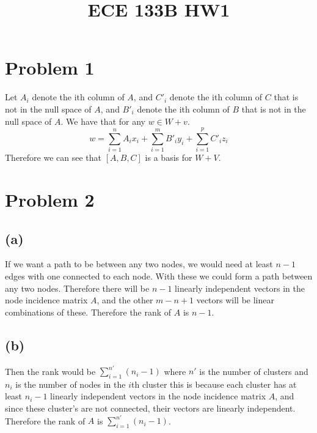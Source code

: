 
\title{ECE 133B HW1}

\maketitle
\section{Problem 1}
Let $A_i$ denote the ith column of $A$, and $C'_i$ denote the ith column of $C$ that is not 
in the null space of $A$, and $B'_i$ denote the ith column of $B$ that is not in the null space of $A$. We have that for any $w\in W+v$.
$$w = \sum_{i=1}^{n}A_ix_i+\sum_{i=1}^{m}B'_iy_i+\sum_{i=1}^{p}C'_iz_i$$
Therefore we can see that $[A,B,C]$ is a basis for $W+V$. 

\section*{Problem 2}
\subsection*{(a)}
If we want a path to be between any two nodes, we would need at least $n-1$ edges with one connected to each node. With these we could 
form a path between any two nodes. Therefore there will be $n-1$ linearly independent vectors in the node incidence matrix $A$, 
and the other $m-n+1$ vectors will be linear combinations of these. Therefore the rank of $A$ is $n-1$.
\subsection*{(b)}
Then the rank would be $\sum_{i=1}^{n'}(n_i-1)$ where $n'$ is the number of clusters and $n_i$ is the number of nodes in the $i$th cluster
this is because each cluster has at least $n_i-1$ linearly independent vectors in the node incidence matrix $A$, and since these cluster's
are not connected, their vectors are linearly independent. Therefore the rank of $A$ is $\sum_{i=1}^{n'}(n_i-1)$.
